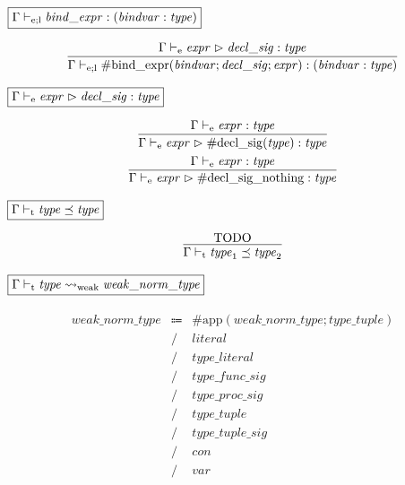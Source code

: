 $\fbox{$\Gamma \vdash_{\mathrm{e}; \mathrm{l}} \mathit{bind\_expr}: (\mathit{bindvar}: \mathit{type})$}$

\begin{gather*}
    \infer{\Gamma \vdash_{\mathrm{e}; \mathrm{l}} \mathrm{\#bind\_expr}(\mathit{bindvar}; \mathit{decl\_sig}; \mathit{expr}): (\mathit{bindvar}: \mathit{type})}{
        \Gamma \vdash_\mathrm{e} \mathit{expr} \vartriangleright \mathit{decl\_sig}: \mathit{type}
    }
\end{gather*}

$\fbox{$\Gamma \vdash_\mathrm{e} \mathit{expr} \vartriangleright \mathit{decl\_sig}: \mathit{type}$}$

\begin{gather*}
    \infer{\Gamma \vdash_\mathrm{e} \mathit{expr} \vartriangleright \mathrm{\#decl\_sig}(\mathit{type}): \mathit{type}}{
        \Gamma \vdash_\mathrm{e} \mathit{expr}: \mathit{type}
    }
    \\
    \infer{\Gamma \vdash_\mathrm{e} \mathit{expr} \vartriangleright \mathrm{\#decl\_sig\_nothing}: \mathit{type}}{
        \Gamma \vdash_\mathrm{e} \mathit{expr}: \mathit{type}
    }
\end{gather*}

$\fbox{$\Gamma \vdash_\mathrm{t} \mathit{type} \preceq \mathit{type}$}$

\begin{gather*}
    \infer{\Gamma \vdash_\mathrm{t} \mathit{type}_1 \preceq \mathit{type}_2}{
        \text{TODO}
    }
\end{gather*}

$\fbox{$\Gamma \vdash_\mathrm{t} \mathit{type} \rightsquigarrow_\mathrm{weak} \mathit{weak\_norm\_type}$}$

\begin{align*}
    \begin{array}{rcll}
        \mathit{weak\_norm\_type}
        &\Coloneq &\mathrm{\#app}(\mathit{weak\_norm\_type}; \mathit{type\_tuple}) \\
        &\mathrel{/} &\mathit{literal} \\
        &\mathrel{/} &\mathit{type\_literal} \\
        &\mathrel{/} &\mathit{type\_func\_sig} \\
        &\mathrel{/} &\mathit{type\_proc\_sig} \\
        &\mathrel{/} &\mathit{type\_tuple} \\
        &\mathrel{/} &\mathit{type\_tuple\_sig} \\
        &\mathrel{/} &\mathit{con} \\
        &\mathrel{/} &\mathit{var}
    \end{array}
\end{align*}

